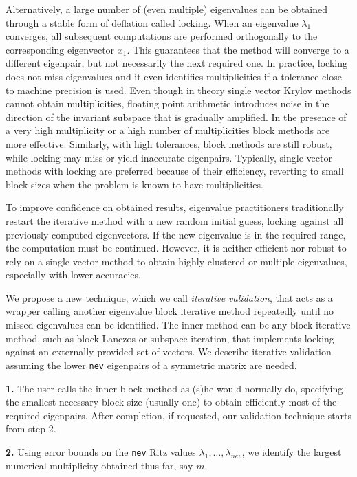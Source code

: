 \documentclass{report}
\begin{document}
Alternatively, a large number of (even multiple) eigenvalues can be
obtained through a stable form of deflation called locking.
When an eigenvalue $\lambda_1$ converges, all subsequent
computations are performed orthogonally to the corresponding
eigenvector $x_1$.
This guarantees that the method will converge to a different eigenpair,
but not necessarily the next required one.
In practice, locking does not miss eigenvalues and it even identifies
multiplicities if a tolerance close to machine precision is used.
Even though in theory single vector Krylov methods cannot obtain
multiplicities, floating point arithmetic introduces noise in the direction
of the invariant subspace that is gradually amplified.
In the presence of a very high multiplicity or a high number of multiplicities
block methods are more effective.
Similarly, with high tolerances, block methods are still
robust, while locking may miss or yield inaccurate eigenpairs.
Typically, single vector methods with locking are preferred because of
their efficiency, reverting to small block sizes when the problem is
known to have multiplicities.

To improve confidence on obtained results, eigenvalue practitioners
traditionally restart the iterative method with a new random initial guess,
locking against all previously computed eigenvectors.
If the new eigenvalue is in the required range, the computation
must be continued.
However, it is neither efficient nor robust to rely on a single
vector method to obtain highly clustered or multiple eigenvalues, especially
with lower accuracies.

We propose a new technique, which we call {\it iterative validation},
that acts as a wrapper calling another eigenvalue block iterative method
repeatedly until no missed eigenvalues can be identified.
The inner method can be any block iterative method, such as
block Lanczos or subspace iteration, that implements locking against
an externally provided set of vectors.
We describe iterative validation assuming the lower {\tt nev}
eigenpairs of a symmetric matrix are needed.

{\bf 1.}
The user calls the inner block method as (s)he would normally do,
specifying the smallest necessary block size (usually one) to obtain
efficiently most of the required eigenpairs.
After completion, if requested,
our validation technique starts from step 2.

{\bf 2.}
Using error bounds on the {\tt nev} Ritz values
$\lambda_1, \ldots , \lambda_{nev}$, we identify the largest
numerical multiplicity obtained thus far, say $m$.
\end{document}
